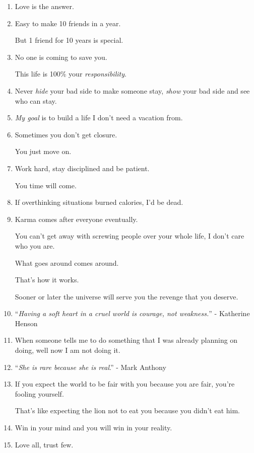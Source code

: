 \documentclass{article}
\numberwithin{equation}{section}
\begin{document}
\begin{enumerate}
    The real question is, \textit{until when?}
    
    Because just like seasons, people \textit{change}.
    \item Love is the answer.
    \item Easy to make 10 friends in a year.
    
    But 1 friend for 10 years is special.
    \item No one is coming to save you.
    
    This life is 100\% your \textit{responsibility}.
    \item Never \textit{hide} your bad side to make someone stay, \textit{show} your bad side and see who can stay.
    \item \textit{My goal} is to build a life I don't need a vacation from.
    \item Sometimes you don't get closure.
    
    You just move on.
    \item Work hard, stay disciplined and be patient.
    
    You time will come.
    \item If overthinking situations burned calories, I'd be dead.
    \item Karma comes after everyone eventually.
    
    You can't get away with screwing people over your whole life, I don't care who you are.
    
    What goes around comes around.
    
    That's how it works.
    
    Sooner or later the universe will serve you the revenge that you deserve.
    \item ``\textit{Having a soft heart in a cruel world is courage, not weakness.}'' - Katherine Henson
    \item When someone tells me to do something that I was already planning on doing, well now I am not doing it.
    \item ``\textit{She is rare because she is real}.'' - Mark Anthony
    \item If you expect the world to be fair with you because you are fair, you're fooling yourself.
    
    That's like expecting the lion not to eat you because you didn't eat him.
    \item Win in your mind and you will win in your reality.
    \item Love all, trust few.
    

\end{enumerate}
\end{document}
